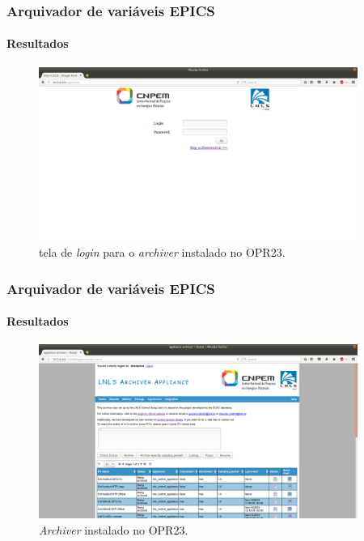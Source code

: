 \begin{frame}
\frametitle {Arquivador de variáveis EPICS}
\framesubtitle{Resultados}

\begin{figure}[h]

\centering
\includegraphics[width=0.93\textwidth]{image/login}
\caption {tela de \textit{login} para o \textit{archiver} instalado no OPR23.}
\label{fig:login}
\end{figure}

\end{frame}

\begin{frame}
\frametitle {Arquivador de variáveis EPICS}
\framesubtitle{Resultados}

\begin{figure}[h]

\centering
\includegraphics[width=0.93\textwidth]{image/archiver}
\caption {\textit{Archiver} instalado no OPR23.}
\label{fig:archiver}
\end{figure}

\end{frame}